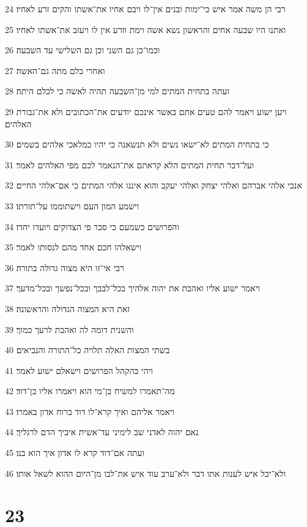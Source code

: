 \par 24 רבי הן משה אמר איש כי־ימות ובנים אין־לו ויבם אחיו את־אשתו והקים זרע לאחיו׃
\par 25 ואתנו היו שבעה אחים והראשון נשא אשה וימת וזרע אין לו ויעזב את־אשתו לאחיו׃
\par 26 וכמו־כן גם השני וכן גם השלישי עד השבעה׃
\par 27 ואחרי כלם מתה גם־האשה׃
\par 28 ועתה בתחית המתים למי מן־השבעה תהיה לאשה כי לכלם היתה׃
\par 29 ויען ישוע ויאמר להם טעים אתם באשר אינכם יודעים את־הכתובים ולא את־גבורת האלהים׃
\par 30 כי בתחית המתים לא־ישאו נשים ולא תנשאנה כי יהיו כמלאכי אלהים בשמים׃
\par 31 ועל־דבר תחית המתים הלא קראתם את־הנאמר לכם מפי האלהים לאמר׃
\par 32 אנכי אלהי אברהם ואלהי יצחק ואלהי יעקב והוא איננו אלהי המתים כי אם־אלהי החיים׃
\par 33 וישמע המון העם וישתוממו על־תורתו׃
\par 34 והפרושים כשמעם כי סכר פי הצדוקים ויועדו יחדו׃
\par 35 וישאלהו חכם אחד מהם לנסותו לאמר׃
\par 36 רבי אי־זו היא מצוה גדולה בתורה׃
\par 37 ויאמר ישוע אליו ואהבת את יהוה אלהיך בכל־לבבך ובכל־נפשך ובכל־מדעך׃
\par 38 זאת היא המצוה הגדולה והראשונה׃
\par 39 והשנית דומה לה ואהבת לרעך כמוך׃
\par 40 בשתי המצות האלה תלויה כל־התורה והנביאים׃
\par 41 ויהי בהקהל הפרושים וישאלם ישוע לאמר׃
\par 42 מה־תאמרו למשיח בן־מי הוא ויאמרו אליו בן־דוד׃
\par 43 ויאמר אליהם ואיך קרא־לו דוד ברוח אדון באמרו׃
\par 44 נאם יהוה לאדני שב לימיני עד־אשית איביך הדם לרגליך׃
\par 45 ועתה אם־דוד קרא לו אדון איך הוא בנו׃
\par 46 ולא־יכל איש לענות אתו דבר ולא־ערב עוד איש את־לבו מן־היום ההוא לשאל אותו׃

\chapter{23}

